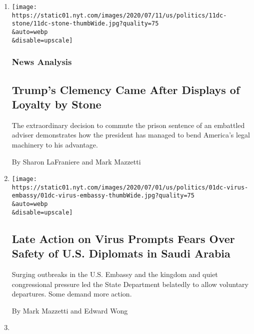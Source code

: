 \begin{enumerate}
\def\labelenumi{\arabic{enumi}.}
\item
  \href{/2020/07/11/us/politics/trump-roger-stone.html}{}

  \texttt{[image: https://static01.nyt.com/images/2020/07/11/us/politics/11dc-stone/11dc-stone-thumbWide.jpg?quality=75\\\&auto=webp\\\&disable=upscale]}

  \hypertarget{news-analysis}{%
  \subsubsection{News Analysis}\label{news-analysis}}

  \hypertarget{trumps-clemency-came-after-displays-of-loyalty-by-stone}{%
  \subsection{Trump's Clemency Came After Displays of Loyalty by
  Stone}\label{trumps-clemency-came-after-displays-of-loyalty-by-stone}}

  The extraordinary decision to commute the prison sentence of an
  embattled adviser demonstrates how the president has managed to bend
  America's legal machinery to his advantage.

  By Sharon LaFraniere and Mark Mazzetti
\item
  \href{/2020/07/01/us/politics/coronavirus-us-embassy-saudi-arabia.html}{}

  \texttt{[image: https://static01.nyt.com/images/2020/07/01/us/politics/01dc-virus-embassy/01dc-virus-embassy-thumbWide.jpg?quality=75\\\&auto=webp\\\&disable=upscale]}

  \hypertarget{late-action-on-virus-prompts-fears-over-safety-of-us-diplomats-in-saudi-arabia}{%
  \subsection{Late Action on Virus Prompts Fears Over Safety of U.S.
  Diplomats in Saudi
  Arabia}\label{late-action-on-virus-prompts-fears-over-safety-of-us-diplomats-in-saudi-arabia}}

  Surging outbreaks in the U.S. Embassy and the kingdom and quiet
  congressional pressure led the State Department belatedly to allow
  voluntary departures. Some demand more action.

  By Mark Mazzetti and Edward Wong
\item
  \href{/2020/06/28/us/politics/michael-flynn-sidney-powell.html}{}


\end{enumerate}
